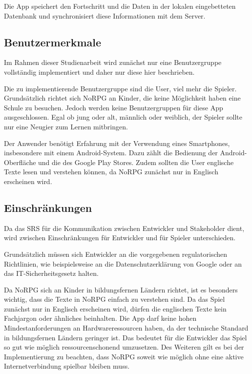 		Die App speichert den Fortschritt und die Daten in der lokalen eingebetteten Datenbank und synchronisiert diese Informationen mit dem Server.
	
	\subsection{Benutzermerkmale}
		Im Rahmen dieser Studienarbeit wird zunächst nur eine Benutzergruppe vollständig implementiert und daher nur diese hier beschrieben.
		
		Die zu implementierende Benutzergruppe sind die User, viel mehr die Spieler. Grundsätzlich richtet sich NoRPG an Kinder, die keine Möglichkeit haben eine Schule zu besuchen. Jedoch werden keine Benutzergruppen für diese App ausgeschlossen. Egal ob jung oder alt, männlich oder weiblich, der Spieler sollte nur eine Neugier zum Lernen mitbringen. 
		
		Der Anwender benötigt Erfahrung mit der Verwendung eines Smartphones, insbesondere mit einem Android-System. Dazu zählt die Bedienung der Android-Oberfläche und die des Google Play Stores. Zudem sollten die User englische Texte lesen und verstehen können, da NoRPG zunächst nur in Englisch erscheinen wird.
			
	\subsection{Einschränkungen}
		Da das \ac{SRS} für die Kommunikation zwischen Entwickler und Stakeholder dient, wird zwischen Einschränkungen für Entwickler und für Spieler unterschieden.
		
		Grundsätzlich müssen sich Entwickler an die vorgegebenen regulatorischen Richtlinien, wie beispielsweise an die Datenschutzerklärung von Google oder an das IT-Sicherheitsgesetz halten.
		
		Da NoRPG sich an Kinder in bildungsfernen Ländern richtet, ist es besonders wichtig, dass die Texte in NoRPG einfach zu verstehen sind. Da das Spiel zunächst nur in Englisch erscheinen wird, dürfen die englischen Texte kein Fachjargon oder ähnliches beinhalten. Die App darf keine hohen Mindestanforderungen an Hardwareressourcen haben, da der technische Standard in bildungsfernen Ländern geringer ist. Das bedeutet für die Entwickler das Spiel so gut wie möglich ressourcenschonend umzusetzen. Des Weiteren gilt es bei der Implementierung zu beachten, dass NoRPG soweit wie möglich ohne eine aktive Internetverbindung spielbar bleiben muss.
		
